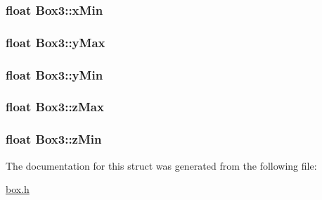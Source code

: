 \subsubsection[{\texorpdfstring{x\+Min}{xMin}}]{\setlength{\rightskip}{0pt plus 5cm}float Box3\+::x\+Min}\hypertarget{structBox3_a57cfa92667f7a90de818969c45e97202}{}\label{structBox3_a57cfa92667f7a90de818969c45e97202}
\subsubsection[{\texorpdfstring{y\+Max}{yMax}}]{\setlength{\rightskip}{0pt plus 5cm}float Box3\+::y\+Max}\hypertarget{structBox3_a449f23c540bae6c91f0599124a895147}{}\label{structBox3_a449f23c540bae6c91f0599124a895147}
\subsubsection[{\texorpdfstring{y\+Min}{yMin}}]{\setlength{\rightskip}{0pt plus 5cm}float Box3\+::y\+Min}\hypertarget{structBox3_ae8d4e1606538f889c4df868eb55b2c74}{}\label{structBox3_ae8d4e1606538f889c4df868eb55b2c74}
\subsubsection[{\texorpdfstring{z\+Max}{zMax}}]{\setlength{\rightskip}{0pt plus 5cm}float Box3\+::z\+Max}\hypertarget{structBox3_a4cecfefa0146353bd4e89623176672e1}{}\label{structBox3_a4cecfefa0146353bd4e89623176672e1}
\subsubsection[{\texorpdfstring{z\+Min}{zMin}}]{\setlength{\rightskip}{0pt plus 5cm}float Box3\+::z\+Min}\hypertarget{structBox3_a265c3306101d211cf65fb2fb36dbc276}{}\label{structBox3_a265c3306101d211cf65fb2fb36dbc276}


The documentation for this struct was generated from the following file\+:\begin{DoxyCompactItemize}
\item 
\hyperlink{box_8h}{box.\+h}\end{DoxyCompactItemize}
